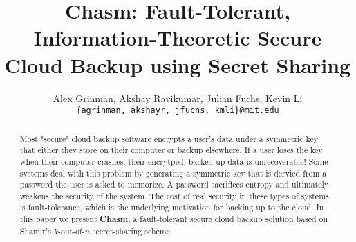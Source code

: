 \documentclass[letterpaper,twocolumn,10pt]{article}
\begin{document}
\color{Black}
\title{Chasm: Fault-Tolerant, Information-Theoretic Secure Cloud Backup using Secret Sharing}
\author{Alex Grinman, Akshay Ravikumar, Julian Fuchs, Kevin Li \\ \texttt{\{agrinman, akshayr, jfuchs, kmli\}@mit.edu}}
\date{}
\maketitle

\begin{abstract}
Most "secure" cloud backup software encrypts a user's data under a symmetric key that either they store on their computer or backup elsewhere. If a user loses the key when their computer crashes, their encrytped, backed-up data is unrecoverable! Some systems deal with this problem by generating a symmetric key that is dervied from a password the user is asked to memorize. A password sacrifices entropy and ultimately weakens the security of the system. The cost of real security in these types of systems is fault-tolerance, which is the underlying motivation for backing up to the cloud. In this paper we present {\bf Chasm}, a fault-tolerant secure cloud backup solution based on Shamir's $k$-out-of-$n$ secret-sharing scheme.
\end{abstract}
\end{document}
